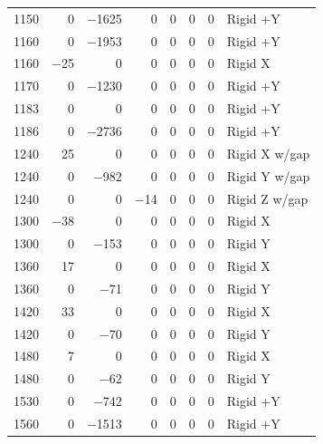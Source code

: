 \begin{longtable}{lrrrrrrl}
    1150 & \num{0} & \num{-1625} & \num{0} & \num{0} & \num{0} & \num{0} & Rigid +Y \\
    1160 & \num{0} & \num{-1953} & \num{0} & \num{0} & \num{0} & \num{0} & Rigid +Y \\
    1160 & \num{-25} & \num{0} & \num{0} & \num{0} & \num{0} & \num{0} & Rigid X \\
    1170 & \num{0} & \num{-1230} & \num{0} & \num{0} & \num{0} & \num{0} & Rigid +Y \\
    1183 & \num{0} & \num{0} & \num{0} & \num{0} & \num{0} & \num{0} & Rigid +Y \\
    1186 & \num{0} & \num{-2736} & \num{0} & \num{0} & \num{0} & \num{0} & Rigid +Y \\
    1240 & \num{25} & \num{0} & \num{0} & \num{0} & \num{0} & \num{0} & Rigid X w/gap \\
    1240 & \num{0} & \num{-982} & \num{0} & \num{0} & \num{0} & \num{0} & Rigid Y w/gap \\
    1240 & \num{0} & \num{0} & \num{-14} & \num{0} & \num{0} & \num{0} & Rigid Z w/gap \\
    1300 & \num{-38} & \num{0} & \num{0} & \num{0} & \num{0} & \num{0} & Rigid X \\
    1300 & \num{0} & \num{-153} & \num{0} & \num{0} & \num{0} & \num{0} & Rigid Y \\
    1360 & \num{17} & \num{0} & \num{0} & \num{0} & \num{0} & \num{0} & Rigid X \\
    1360 & \num{0} & \num{-71} & \num{0} & \num{0} & \num{0} & \num{0} & Rigid Y \\
    1420 & \num{33} & \num{0} & \num{0} & \num{0} & \num{0} & \num{0} & Rigid X \\
    1420 & \num{0} & \num{-70} & \num{0} & \num{0} & \num{0} & \num{0} & Rigid Y \\
    1480 & \num{7} & \num{0} & \num{0} & \num{0} & \num{0} & \num{0} & Rigid X \\
    1480 & \num{0} & \num{-62} & \num{0} & \num{0} & \num{0} & \num{0} & Rigid Y \\
    1530 & \num{0} & \num{-742} & \num{0} & \num{0} & \num{0} & \num{0} & Rigid +Y \\
    1560 & \num{0} & \num{-1513} & \num{0} & \num{0} & \num{0} & \num{0} & Rigid +Y \\
\end{longtable}
\endgroup
